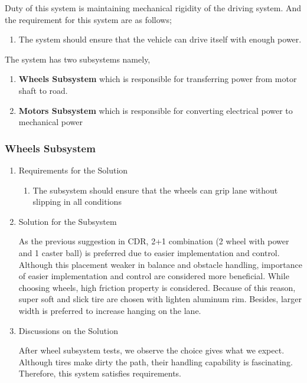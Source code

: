 \documentclass[a4paper,12pt]{article}
\begin{document}
		Duty of this system is maintaining mechanical rigidity of the driving system. And the requirement for this system are as follows;
		
		\begin{enumerate}
			\item The system should ensure that the vehicle can drive itself with enough power.	
		\end{enumerate}	
		
		
		The system has two subsystems namely,
			
			\begin{enumerate}
				\item \textbf{Wheels Subsystem} which is responsible for transferring power from motor shaft to road.
				\item \textbf{Motors Subsystem} which is responsible for converting electrical power to mechanical power
			\end{enumerate}
		
	\subsubsection{Wheels Subsystem}
	
		\begin{enumerate}
			\item {Requirements for the Solution}
			
			\begin{enumerate}
					\item The subsystem should ensure that the wheels can grip lane without slipping in all conditions 
			\end{enumerate}
	
	
			\item {Solution for the Subsystem}
			
			As the previous suggestion in CDR, 2+1 combination (2 wheel with power and 1 caster ball) is preferred due to easier implementation and control. Although this placement weaker in balance and obstacle handling, importance of easier implementation and control are considered more beneficial. 
While choosing wheels, high friction property is considered. Because of this reason, super soft and slick tire are chosen with lighten aluminum rim. Besides, larger width is preferred to increase hanging on the lane.      

			
			\item {Discussions on the Solution}
			
			After wheel subsystem tests, we observe the choice gives what we expect. Although tires make dirty the path, their handling capability is fascinating. Therefore, this system satisfies requirements.
			
		\end{enumerate}
		
\end{document}
